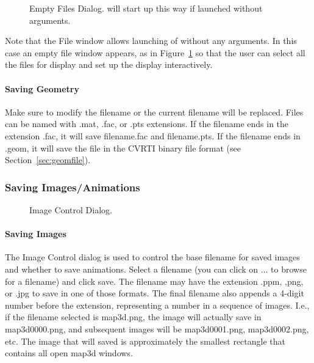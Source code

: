 \begin{figure}[htb]
  \begin{makeimage}
  \end{makeimage}
  \filesdialogthree
  \caption{\label{fig:file3} Empty Files Dialog. \map{} will start up this way
            if launched without arguments.}
\end{figure}

Note that the File window allows launching of \map{} without any arguments.
In this case an empty file window appears, as in Figure~\ref{fig:file3} so
that the user can select all the files for display and set up the display
interactively.

\paragraph{Saving Geometry}
\label{sec:savegeom}


Make sure to modify the filename or the current filename will be replaced.  
Files can be named with .mat, .fac, or .pts extensions. If the filename ends
in the extension .fac, it will save filename.fac and filename.pts.  If the
filename ends in .geom, it will save the file in the CVRTI binary file
format (see Section~\ref{sec:geomfile}). 

\subsubsection{Saving Images/Animations}
\label{sec:saving}

\begin{figure}[htb]
  \begin{makeimage}
  \end{makeimage}
  \savedialog
  \caption{\label{fig:save1} Image Control Dialog.}
\end{figure}


\paragraph{Saving Images}
\label{sec:saveimages}

The Image Control dialog is used to control the base filename for saved images
and whether to save animations.  Select a filename (you can click on ... to browse for
a filename) and click save. The filename may have the extension .ppm, ,png,
or .jpg to save in one of those formats.  The final filename also appends a
4-digit number before the extension, representing a number in a sequence of
images.  I.e., if the filename selected is map3d.png, the image will
actually save in map3d0000.png, and subsequent images will be
map3d0001.png, map3d0002.png, etc.  The image that will saved is
approximately the smallest rectangle that contains all open map3d windows.

